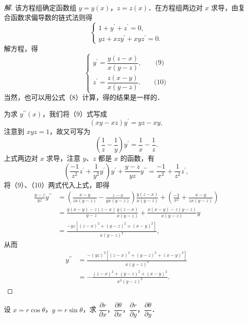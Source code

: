 \begin{proof}[解]
该方程组确定函数组 $y=y(x)$，$z=z(x)$．在方程组两边对 $x$ 求导，由复合函数求偏导数的链式法则得
\[
\begin{cases}
1+y^{\prime}+z^{\prime}=0,\\
yz+xzy^{\prime}+xyz^{\prime}=0.
\end{cases}
\]
解方程，得
\[
\begin{cases}
y^{\prime}=\dfrac{y(z-x)}{x(y-z)},\qquad\text{(9)}\\[10pt]
z^{\prime}=\dfrac{z(x-y)}{x(y-z)}.\qquad\text{(10)}
\end{cases}
\]
当然，也可以用公式（8）计算，得的结果是一样的．

为求 $y^{\prime\prime}(x)$，我们将（9）式写成
\[
(xy-xz)y^{\prime}=yz-xy,
\]
注意到 $xyz=1$，故又可写为
\[
\left(\frac{1}{z}-\frac{1}{y}\right)y^{\prime}=\frac{1}{x}-\frac{1}{z}.
\]
上式两边对 $x$ 求导，注意 $y$、$z$ 都是 $x$ 的函数，有
\[
\left(\frac{-1}{z^{2}}z^{\prime}+\frac{1}{y^{2}}y^{\prime}\right)y^{\prime}+\frac{y-z}{yz}y^{\prime\prime}=\frac{-1}{x^{2}}+\frac{1}{z^{2}}z^{\prime},
\]
将（9）、（10）两式代入上式，即得
\[
\begin{aligned}
\frac{y-z}{yz}y^{\prime\prime}&=\left(\frac{x-y}{zx(y-z)}-\frac{z-x}{yx(y-z)}\right)\frac{y(z-x)}{x(y-z)}+\left(\frac{-1}{x^{2}}+\frac{x-y}{zx(y-z)}\right)\\
&=\frac{y(x-y)-z(z-x)}{y-z}\frac{y(z-x)}{x(y-z)}+\frac{x(x-y)-z(y-z)}{x(y-z)}y\\
&=\frac{-yz\left[(z-x)^{2}+(y-z)^{2}+(x-y)^{2}\right]}{x(y-z)^{2}},
\end{aligned}
\]
从而
\[
\begin{aligned}
y^{\prime\prime}&=\frac{-(yz)^{2}\left[(z-x)^{2}+(y-z)^{2}+(x-y)^{2}\right]}{x(y-z)^{3}}\\
&=-\frac{(z-x)^{2}+(y-z)^{2}+(x-y)^{2}}{x^{3}(y-z)^{3}}.
\end{aligned}
\]
\end{proof}

\begin{example}\label{ex:16-2-10}
设 $x=r\cos\theta$，$y=r\sin\theta$，求 $\dfrac{\partial r}{\partial x}$，$\dfrac{\partial\theta}{\partial x}$，$\dfrac{\partial r}{\partial y}$，$\dfrac{\partial\theta}{\partial y}$．
\end{example}

